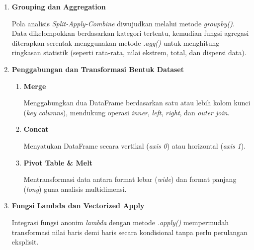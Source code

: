\documentclass[12pt,a4paper]{article}
\begin{document}
\begin{enumerate}[label=\alph*., leftmargin=2.25cm, labelwidth=0.75cm, labelsep=0cm, align=left]
    \hspace*{0.85cm}Pandas menyediakan metode \textit{sort\_index()} untuk mengurutkan sumbu indeks dan \textit{sort\_values()} untuk mengurutkan berdasarkan nilai kolom tertentu. Penyaringan data (\textit{filtering}) dilakukan melalui ekspresi boolean (\textit{boolean masking}), metode \textit{.isin()}, ekspresi string \textit{.query()}, maupun pencarian pola teks \textit{.str.contains()}.

    \item \textbf{Grouping dan Aggregation}
    
    \hspace*{0.85cm}Pola analisis \textit{Split-Apply-Combine} diwujudkan melalui metode \textit{groupby()}. Data dikelompokkan berdasarkan kategori tertentu, kemudian fungsi agregasi diterapkan serentak menggunakan metode \textit{.agg()} untuk menghitung ringkasan statistik (seperti rata-rata, nilai ekstrem, total, dan dispersi data).

    \item \textbf{Penggabungan dan Transformasi Bentuk Dataset}
    \begin{enumerate}[label=\arabic*), leftmargin=0.75cm, labelwidth=0.75cm, labelsep=0cm, align=left]
        \item \textbf{Merge}
        
        \hspace*{0.85cm}Menggabungkan dua DataFrame berdasarkan satu atau lebih kolom kunci (\textit{key columns}), mendukung operasi \textit{inner}, \textit{left}, \textit{right}, dan \textit{outer join}.
        
        \item \textbf{Concat}
        
        \hspace*{0.85cm}Menyatukan DataFrame secara vertikal (\textit{axis 0}) atau horizontal (\textit{axis 1}).
        
        \item \textbf{Pivot Table \& Melt}
        
        \hspace*{0.85cm}Mentransformasi data antara format lebar (\textit{wide}) dan format panjang (\textit{long}) guna analisis multidimensi.
    \end{enumerate}

    \item \textbf{Fungsi Lambda dan Vectorized Apply}
    
    \hspace*{0.85cm}Integrasi fungsi anonim \textit{lambda} dengan metode \textit{.apply()} mempermudah transformasi nilai baris demi baris secara kondisional tanpa perlu perulangan eksplisit.
\end{enumerate}
\end{document}
